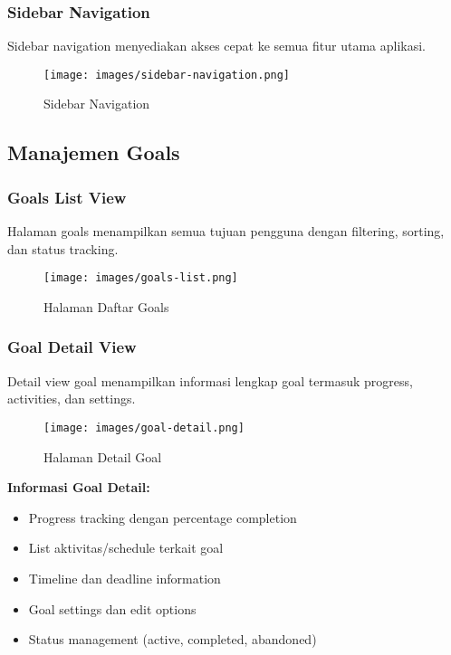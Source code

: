 \subsubsection{Sidebar Navigation}
Sidebar navigation menyediakan akses cepat ke semua fitur utama aplikasi.

\begin{figure}[H]
\centering
\texttt{[image: images/sidebar-navigation.png]}
\caption{Sidebar Navigation}
\label{fig:sidebar}
\end{figure}

\subsection{Manajemen Goals}

\subsubsection{Goals List View}
Halaman goals menampilkan semua tujuan pengguna dengan filtering, sorting, dan status tracking.

\begin{figure}[H]
\centering
\texttt{[image: images/goals-list.png]}
\caption{Halaman Daftar Goals}
\label{fig:goals-list}
\end{figure}

\subsubsection{Goal Detail View}
Detail view goal menampilkan informasi lengkap goal termasuk progress, activities, dan settings.

\begin{figure}[H]
\centering
\texttt{[image: images/goal-detail.png]}
\caption{Halaman Detail Goal}
\label{fig:goal-detail}
\end{figure}

\textbf{Informasi Goal Detail:}
\begin{itemize}
\item Progress tracking dengan percentage completion
\item List aktivitas/schedule terkait goal
\item Timeline dan deadline information
\item Goal settings dan edit options
\item Status management (active, completed, abandoned)
\end{itemize}

